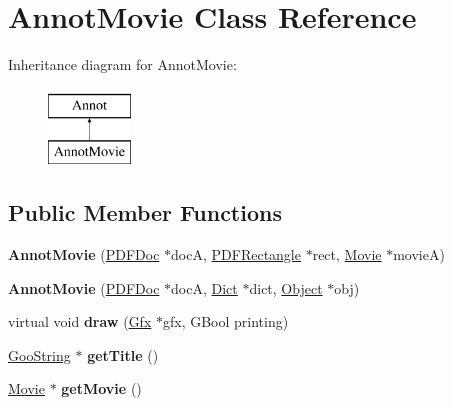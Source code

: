 \hypertarget{class_annot_movie}{}\section{Annot\+Movie Class Reference}
\label{class_annot_movie}
Inheritance diagram for Annot\+Movie\+:\begin{figure}[H]
\begin{center}
\leavevmode
\includegraphics[height=2.000000cm]{class_annot_movie}
\end{center}
\end{figure}
\subsection*{Public Member Functions}
\begin{DoxyCompactItemize}
\item 
\mbox{\label{class_annot_movie_adb786aafb35ba3ba6abf7324cdf80ac3}} 
{\bfseries Annot\+Movie} (\hyperlink{class_p_d_f_doc}{P\+D\+F\+Doc} $\ast$docA, \hyperlink{class_p_d_f_rectangle}{P\+D\+F\+Rectangle} $\ast$rect, \hyperlink{class_movie}{Movie} $\ast$movieA)
\item 
\mbox{\label{class_annot_movie_a2a5bbe44158f13e4f5eda87beaf8dbb5}} 
{\bfseries Annot\+Movie} (\hyperlink{class_p_d_f_doc}{P\+D\+F\+Doc} $\ast$docA, \hyperlink{class_dict}{Dict} $\ast$dict, \hyperlink{class_object}{Object} $\ast$obj)
\item 
\mbox{\label{class_annot_movie_aa5c7bf927ac77895c456dbe122a8299b}} 
virtual void {\bfseries draw} (\hyperlink{class_gfx}{Gfx} $\ast$gfx, G\+Bool printing)
\item 
\mbox{\label{class_annot_movie_a0e26bfdc861f946e3d65a7932e3d33d6}} 
\hyperlink{class_goo_string}{Goo\+String} $\ast$ {\bfseries get\+Title} ()
\item 
\mbox{\label{class_annot_movie_aac4858b28adf355f8c0bcdf6db62d88e}} 
\hyperlink{class_movie}{Movie} $\ast$ {\bfseries get\+Movie} ()
\end{DoxyCompactItemize}
